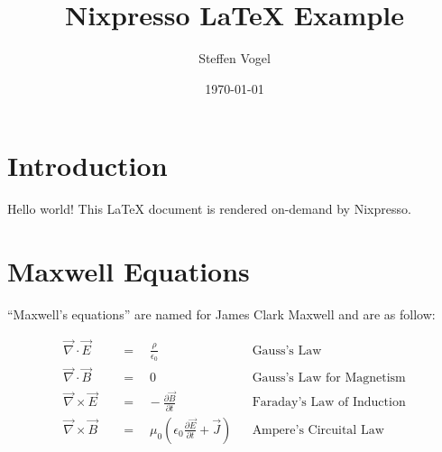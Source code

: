 \documentclass{article}
\title{Nixpresso \LaTeX{} Example}
\author{Steffen Vogel}
\date{\today}
\begin{document}
\maketitle

\section{Introduction}
Hello world! This \LaTeX{} document is rendered on-demand by Nixpresso.

\section{Maxwell Equations}
``Maxwell's equations'' are named for James Clark Maxwell and are as follow:

\begin{align}             
\vec{\nabla} \cdot \vec{E} \quad &=\quad\frac{\rho}{\epsilon_0} &&\text{Gauss's Law} \\      
\vec{\nabla} \cdot \vec{B} \quad &=\quad 0 &&\text{Gauss's Law for Magnetism}\\
\vec{\nabla} \times \vec{E} \quad &=\hspace{10pt}-\frac{\partial{\vec{B}}}{\partial{t}} &&\text{Faraday's Law of Induction} \\ 
\vec{\nabla} \times \vec{B} \quad &=\quad \mu_0\left( \epsilon_0\frac{\partial{\vec{E}}}{\partial{t}}+\vec{J}\right) &&\text{Ampere's Circuital Law}
\end{align}
\end{document}
